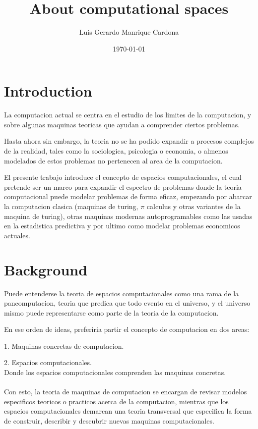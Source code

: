 \documentclass[12pt]{book}
\title{About computational spaces}
\author{Luis Gerardo Manrique Cardona}
\date{\today}
\begin{document}
\maketitle
\tableofcontents

\chapter{Introduction}
La computacion actual se centra en el estudio de los limites de la computacion, y sobre algunas maquinas teoricas
que ayudan a comprender ciertos problemas.

Hasta ahora sin embargo, la teoria no se ha podido expandir a procesos complejos de la realidad, tales como la sociologica,
psicologia o economia, o almenos modelados de estos problemas no pertenecen al area de la computacion.

El presente trabajo introduce el concepto de espacios computacionales, el cual pretende ser un marco para expandir el espectro
de problemas donde la teoria computacional puede modelar problemas de forma eficaz, empezando por abarcar la computacion clasica 
(maquinas de turing, $\pi $ calculus y otras variantes de la maquina de turing), otras maquinas modernas autoprogramables como
las usadas en la estadistica predictiva y por ultimo como modelar problemas economicos actuales.

\chapter{Background}

Puede entenderse la teoria de espacios computacionales como una rama de la pancomputacion, teoria que predica que todo evento en
el universo, y el universo mismo puede representarse como parte de la teoria de la computacion.

En ese orden de ideas, preferiria partir el concepto de computacion en dos areas:

1. Maquinas concretas de computacion.

2. Espacios computacionales. 
\\
Donde los espacios computacionales comprenden las maquinas concretas.
\\
\\
Con esto, la teoria de maquinas de computacion se encargan de revisar modelos especificos teoricos o practicos acerca de la computacion,
mientras que los espacios computacionales demarcan una teoria transversal que especifica la forma de construir, describir y descubrir
nuevas maquinas computacionales.
\end{document}
